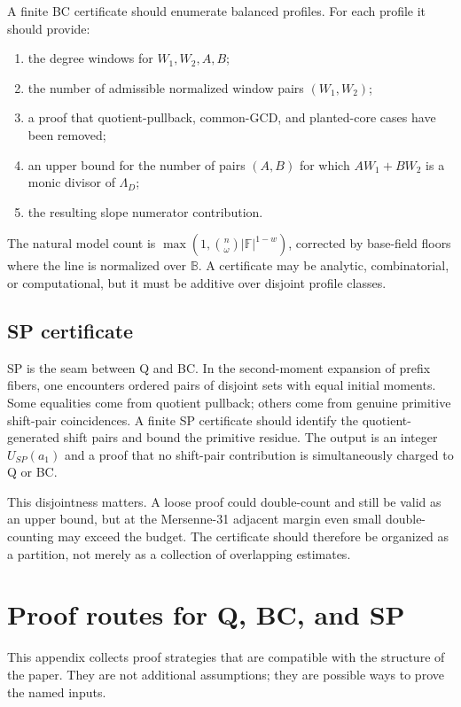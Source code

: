 \documentclass[11pt]{article}
\theoremstyle{definition}
\theoremstyle{remark}
\newcommand{\F}{\mathbb F}
\newcommand{\BB}{\mathbb B}
\begin{document}
A finite BC certificate should enumerate balanced profiles.  For each profile it should provide:
\begin{enumerate}[label=\textup{(\roman*)},leftmargin=2.1em]
\item the degree windows for \(W_1,W_2,A,B\);
\item the number of admissible normalized window pairs \((W_1,W_2)\);
\item a proof that quotient-pullback, common-GCD, and planted-core cases have been removed;
\item an upper bound for the number of pairs \((A,B)\) for which \(AW_1+BW_2\) is a monic divisor of \(\Lambda_D\);
\item the resulting slope numerator contribution.
\end{enumerate}
The natural model count is \(\max(1,\binom n\omega |\F|^{1-w})\), corrected by base-field floors where the line is normalized over \(\BB\).  A certificate may be analytic, combinatorial, or computational, but it must be additive over disjoint profile classes.

\subsection{SP certificate}\label{appsub:SP-cert}

SP is the seam between Q and BC.  In the second-moment expansion of prefix fibers, one encounters ordered pairs of disjoint sets with equal initial moments.  Some equalities come from quotient pullback; others come from genuine primitive shift-pair coincidences.  A finite SP certificate should identify the quotient-generated shift pairs and bound the primitive residue.  The output is an integer \(U_{SP}(a_1)\) and a proof that no shift-pair contribution is simultaneously charged to Q or BC.

This disjointness matters.  A loose proof could double-count and still be valid as an upper bound, but at the Mersenne-31 adjacent margin even small double-counting may exceed the budget.  The certificate should therefore be organized as a partition, not merely as a collection of overlapping estimates.

\section{Proof routes for Q, BC, and SP}\label{app:proof-routes}

This appendix collects proof strategies that are compatible with the structure of the paper.  They are not additional assumptions; they are possible ways to prove the named inputs.
\end{document}
